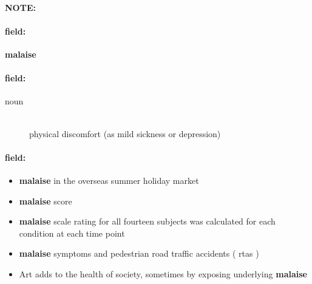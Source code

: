 \documentclass[12pt]{article}
\newenvironment{note}{\paragraph{NOTE:}}{}
\newenvironment{field}{\paragraph{field:}}{}
\begin{document}
\begin{note}
\begin{field}
\textbf{\large malaise}
\end{field}


\begin{field}
\begin{description}
\item[noun] \hfill \\ 
physical discomfort (as mild sickness or depression)

\end{description}
\end{field}

\begin{field}
\begin{itemize}
\item \textbf{malaise} in the overseas summer holiday market
\item \textbf{malaise} score
\item \textbf{malaise} scale rating for all fourteen subjects was calculated for each condition at each time point
\item \textbf{malaise} symptoms and pedestrian road traffic accidents ( rtas )
\item Art adds to the health of society, sometimes by exposing underlying \textbf{malaise}
\end{itemize}
\end{field}
\end{note}
\end{document}
